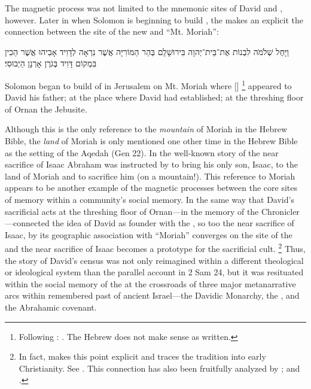 The magnetic process was not limited to the mnemonic sites of David and \thetemple, however. Later in \chronicles when Solomon is beginning to build \thetemple, the \chronicler makes an explicit the connection between the site of the new \temple and ``Mt. Moriah'':
\begin{hebrewtext}
    וַיָּחֶל שְׁלֹמֹה לִבְנוֹת אֶת־בֵּית־יְהוָה בִּירוּשָׁלִַם בְּהַר הַמּוֹרִיָּה אֲשֶׁר נִרְאָה לְדָוִיד אָבִיהוּ אֲשֶׁר הֵכִין בִּמְקוֹם דָּוִיד בְּגֹרֶן אָרְנָן הַיְבוּסִי׃
\end{hebrewtext}
\begin{translation}
    Solomon began to build \thetemple of \yahweh in Jerusalem on Mt. Moriah where [\yahweh]%
        \footnote{Following \lxx: 
        .
        The Hebrew does not make sense as written.}
    appeared to David his father;
    at the place where David had established; 
    at the threshing floor of Ornan the Jebusite.
\end{translation}
\noindent
Although this is the only reference to the \emph{mountain} of Moriah in the Hebrew Bible, the \emph{land} of Moriah is only mentioned one other time in the Hebrew Bible as the setting of the Aqedah (Gen 22). In the well-known story of the near sacrifice of Isaac Abraham was instructed by \yahweh to bring his only son, Isaac,  to the land of Moriah and to sacrifice him (on a mountain!). This reference to Moriah appears to be another example of the magnetic processes between the core sites of memory within a community's social memory. In the same way that David's sacrificial acts at the threshing floor of Ornan---in the memory of the Chronicler---connected the idea of David as \temple founder with the \jerusalemtemple, so too the near sacrifice of Isaac, by its geographic association with ``Moriah'' converges on the site of the \jerusalemtemple and the near sacrifice of Isaac becomes a prototype for the sacrificial cult.%
    \footnote{In fact, \vermes makes this point explicit and traces the tradition into early Christianity. See \cite[204--211]{vermes1961}. This connection has also been fruitfully analyzed by \cite{kalimi_htr1990}; \cite[190--191]{kalimi_jnes2009} and \cite{amit_brenner-polak2009}.}
Thus, the story of David's census was not only reimagined within a different theological or ideological system than the parallel account in 2 Sam 24, but it was resituated within the social memory of the \chronicler at the crossroads of three major metanarrative arcs within remembered past of ancient Israel---the Davidic Monarchy, the \jerusalemtemple, and the Abrahamic covenant.

